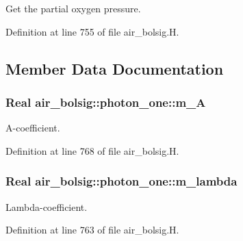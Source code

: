 Get the partial oxygen pressure. 



Definition at line 755 of file air\+\_\+bolsig.\+H.



\subsection{Member Data Documentation}
\subsubsection[{\texorpdfstring{m\+\_\+A}{m_A}}]{\setlength{\rightskip}{0pt plus 5cm}Real air\+\_\+bolsig\+::photon\+\_\+one\+::m\+\_\+A\hspace{0.3cm}{\ttfamily [protected]}}\hypertarget{classair__bolsig_1_1photon__one_aabb5e1be576c0767e6df45a909123529}{}\label{classair__bolsig_1_1photon__one_aabb5e1be576c0767e6df45a909123529}


A-\/coefficient. 



Definition at line 768 of file air\+\_\+bolsig.\+H.

\subsubsection[{\texorpdfstring{m\+\_\+lambda}{m_lambda}}]{\setlength{\rightskip}{0pt plus 5cm}Real air\+\_\+bolsig\+::photon\+\_\+one\+::m\+\_\+lambda\hspace{0.3cm}{\ttfamily [protected]}}\hypertarget{classair__bolsig_1_1photon__one_a6761d055560948c72503a577ffc80cfa}{}\label{classair__bolsig_1_1photon__one_a6761d055560948c72503a577ffc80cfa}


Lambda-\/coefficient. 



Definition at line 763 of file air\+\_\+bolsig.\+H.

